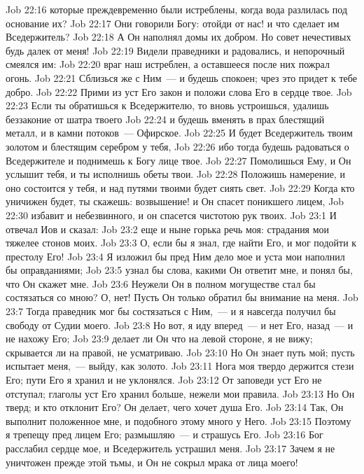 \vs Job 22:16 которые преждевременно были истреблены, когда вода разлилась под основание их?
\vs Job 22:17 Они говорили Богу: отойди от нас! и что сделает им Вседержитель?
\vs Job 22:18 А Он наполнял домы их добром. Но совет нечестивых будь далек от меня!
\vs Job 22:19 Видели праведники и радовались, и непорочный смеялся им:
\vs Job 22:20 враг наш истреблен, а оставшееся после них пожрал огонь.
\vs Job 22:21 Сблизься же с Ним~--- и будешь спокоен; чрез это придет к тебе добро.
\vs Job 22:22 Прими из уст Его закон и положи слова Его в сердце твое.
\vs Job 22:23 Если ты обратишься к Вседержителю, то вновь устроишься, удалишь беззаконие от шатра твоего
\vs Job 22:24 и будешь вменять в прах блестящий металл, и в камни потоков~---  Офирское.
\vs Job 22:25 И будет Вседержитель твоим золотом и блестящим серебром у тебя,
\vs Job 22:26 ибо тогда будешь радоваться о Вседержителе и поднимешь к Богу лице твое.
\vs Job 22:27 Помолишься Ему, и Он услышит тебя, и ты исполнишь обеты твои.
\vs Job 22:28 Положишь намерение, и оно состоится у тебя, и над путями твоими будет сиять свет.
\vs Job 22:29 Когда кто уничижен будет, ты скажешь: возвышение! и Он спасет поникшего лицем,
\vs Job 22:30 избавит и небезвинного, и он спасется чистотою рук твоих.
\vs Job 23:1 И отвечал Иов и сказал:
\vs Job 23:2 еще и ныне горька речь моя: страдания мои тяжелее стонов моих.
\vs Job 23:3 О, если бы я знал, где найти Его, и мог подойти к престолу Его!
\vs Job 23:4 Я изложил бы пред Ним дело мое и уста мои наполнил бы оправданиями;
\vs Job 23:5 узнал бы слова, какими Он ответит мне, и понял бы, что Он скажет мне.
\vs Job 23:6 Неужели Он в полном могуществе стал бы состязаться со мною? О, нет! Пусть Он только обратил бы внимание на меня.
\vs Job 23:7 Тогда праведник мог бы состязаться с Ним,~--- и я навсегда получил бы свободу от Судии моего.
\vs Job 23:8 Но вот, я иду вперед~--- и нет Его, назад~--- и не нахожу Его;
\vs Job 23:9 делает ли Он что на левой стороне, я не вижу; скрывается ли на правой, не усматриваю.
\vs Job 23:10 Но Он знает путь мой; пусть испытает меня,~--- выйду, как золото.
\vs Job 23:11 Нога моя твердо держится стези Его; пути Его я хранил и не уклонялся.
\vs Job 23:12 От заповеди уст Его не отступал; глаголы уст Его хранил больше, нежели мои правила.
\vs Job 23:13 Но Он тверд; и кто отклонит Его? Он делает, чего хочет душа Его.
\vs Job 23:14 Так, Он выполнит положенное мне, и подобного этому много у Него.
\vs Job 23:15 Поэтому я трепещу пред лицем Его; размышляю~--- и страшусь Его.
\vs Job 23:16 Бог расслабил сердце мое, и Вседержитель устрашил меня.
\vs Job 23:17 Зачем я не уничтожен прежде этой тьмы, и Он не сокрыл мрака от лица моего!
